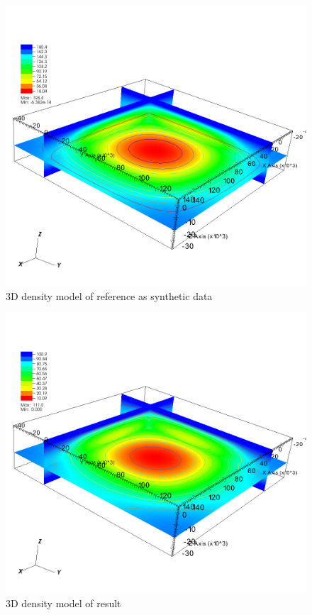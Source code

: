 \begin{figure}
\centering
\includegraphics[width=\textwidth]{density3D-ref.png}
\caption{3D density model of reference as synthetic data}
\label{fig:gravity3D}
\end{figure}

\begin{figure}
\centering
\includegraphics[width=\textwidth]{gravity3D.png}
\caption{3D density model of result}
\label{fig:gravity3D1}
\end{figure}
